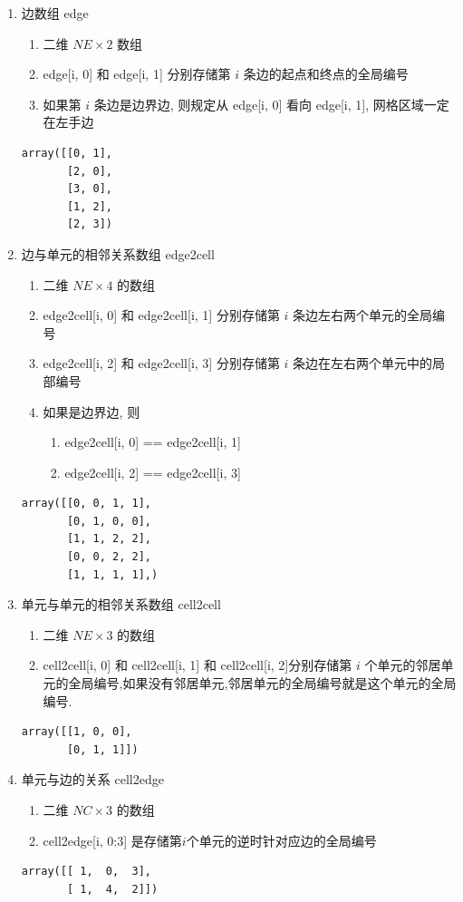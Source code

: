 \documentclass{article}
\begin{document}
\begin{enumerate}
\item 边数组 edge
\begin{enumerate}
    \item 二维 $NE\times 2$ 数组 
    \item edge[i, 0] 和 edge[i, 1] 分别存储第 $i$ 条边的起点和终点的全局编号
    \item 如果第 $i$ 条边是边界边, 则规定从 edge[i, 0] 看向 edge[i, 1], 网格区域一定在左手边
\end{enumerate}
\begin{lstlisting}
array([[0, 1],
       [2, 0],
       [3, 0],
       [1, 2],
       [2, 3])
\end{lstlisting}
\item 边与单元的相邻关系数组 edge2cell
\begin{enumerate}
    \item 二维 $NE \times 4 $ 的数组
    \item edge2cell[i, 0] 和 edge2cell[i, 1] 分别存储第 $i$ 条边左右两个单元的全局编号
\newpage
    \item edge2cell[i, 2] 和 edge2cell[i, 3] 分别存储第 $i$ 条边在左右两个单元中的局部编号
    \item 如果是边界边, 则
\begin{enumerate}
        \item edge2cell[i, 0] == edge2cell[i, 1] 
        \item edge2cell[i, 2] == edge2cell[i, 3]
\end{enumerate}
\end{enumerate}
\begin{lstlisting}
array([[0, 0, 1, 1],
       [0, 1, 0, 0],
       [1, 1, 2, 2],
       [0, 0, 2, 2],
       [1, 1, 1, 1],)
\end{lstlisting}
\item 单元与单元的相邻关系数组 cell2cell
\begin{enumerate}
  \item 二维 $NE \times 3$ 的数组
  \item cell2cell[i, 0] 和 cell2cell[i, 1] 和 cell2cell[i, 2]分别存储第 $i$ 个单元的邻居单元的全局编号,如果没有邻居单元,邻居单元的全局编号就是这个单元的全局编号.
  
\end{enumerate}
\begin{lstlisting}
array([[1, 0, 0],
       [0, 1, 1]])
\end{lstlisting}
\item 单元与边的关系 cell2edge
\begin{enumerate}
\item 二维 $NC \times 3$ 的数组
\item cell2edge[i, 0:3] 是存储第$i$个单元的逆时针对应边的全局编号
\end{enumerate}
\begin{lstlisting}
array([[ 1,  0,  3],
       [ 1,  4,  2]])
\end{lstlisting}
\end{enumerate}
\end{document}
